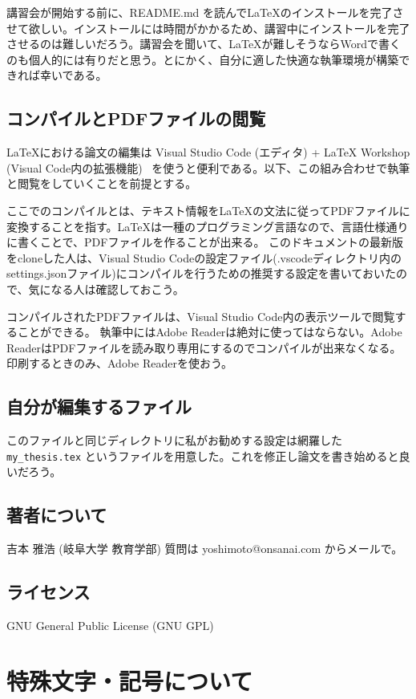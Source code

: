 \documentclass[a4j,openany,11px]{jsbook}
\begin{document}
講習会が開始する前に、README.md を読んで\LaTeX のインストールを完了させて欲しい。インストールには時間がかかるため、講習中にインストールを完了させるのは難しいだろう。講習会を聞いて、LaTeXが難しそうならWordで書くのも個人的には有りだと思う。とにかく、自分に適した快適な執筆環境が構築できれば幸いである。

\section{コンパイルとPDFファイルの閲覧}
\LaTeX における論文の編集は Visual Studio Code (エディタ) + LaTeX Workshop (Visual Code内の拡張機能) ~\cite{latex_workshop}を使うと便利である。以下、この組み合わせで執筆と閲覧をしていくことを前提とする。

ここでのコンパイルとは、テキスト情報を\LaTeX の文法に従ってPDFファイルに変換することを指す。\LaTeX は一種のプログラミング言語なので、言語仕様通りに書くことで、PDFファイルを作ることが出来る。
このドキュメントの最新版をcloneした人は、Visual Studio Codeの設定ファイル(.vscodeディレクトリ内のsettings.jsonファイル)にコンパイルを行うための推奨する設定を書いておいたので、気になる人は確認しておこう。

コンパイルされたPDFファイルは、Visual Studio Code内の表示ツールで閲覧することができる。
執筆中にはAdobe Readerは絶対に使ってはならない。Adobe ReaderはPDFファイルを読み取り専用にするのでコンパイルが出来なくなる。
印刷するときのみ、Adobe Readerを使おう。

\section{自分が編集するファイル}
このファイルと同じディレクトリに私がお勧めする設定は網羅した \verb|my_thesis.tex| というファイルを用意した。これを修正し論文を書き始めると良いだろう。

\section{著者について}

吉本 雅浩 (岐阜大学 教育学部) 質問は yoshimoto@onsanai.com からメールで。

\section{ライセンス}

GNU General Public License (GNU GPL)

\chapter{特殊文字・記号について}
\end{document}
